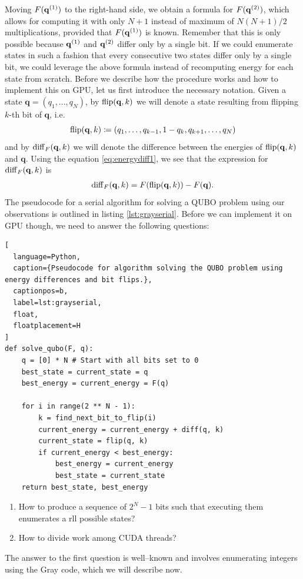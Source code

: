 Moving $F(\mathbf{q}^{(1)})$ to the right-hand side, we obtain a formula for $F(\mathbf{q}^{(2)})$,
which allows for computing it with only $N+1$ instead of maximum of $N(N+1)/2$
multiplications, provided that $F(\mathbf{q}^{(1)})$ is known. Remember that this is only
possible because $\mathbf{q}^{(1)}$ and $\mathbf{q}^{(2)}$ differ only by a single bit. If we could
enumerate states in such a fashion that every consecutive two states differ
only by a single bit, we could leverage the above formula instead of
recomputing energy for each state from scratch. Before we describe how the
procedure works and how to implement this on GPU, let us first introduce the
necessary notation. Given a state $\mathbf{q} = (q_{1},\ldots,q_{N})$, by
$\operatorname*{flip}(\mathbf{q},k)$ we will denote a state resulting from flipping $k$-th
bit of $\mathbf{q}$, i.e.
\begin{equation}
  \operatorname*{flip}(\mathbf{q},k) \coloneq (q_{1}, \ldots, q_{k-1}, 1-q_{k}, q_{k+1}, \ldots, q_{N})
\end{equation}
and by $\operatorname{diff}_{F}(\mathbf{q},k)$ we will denote the difference between the
energies of $\operatorname*{flip}(\mathbf{q},k)$ and $\mathbf{q}$. Using the equation
\eqref{eq:energydiff1}, we see that the expression for
$\operatorname{diff}_{F}(\mathbf{q},k)$ is
\begin{align}
  \begin{split}
    \operatorname{diff}_{F}(\mathbf{q},k) = F(\operatorname*{flip}(\mathbf{q},k)) - F(\mathbf{q}).
  \end{split}
\end{align}
The pseudocode for a serial algorithm for solving a QUBO problem using our
observations is outlined in listing \ref{lst:grayserial}. Before we can
implement it on GPU though, we need to answer the following questions:
\begin{lstlisting}[
  language=Python,
  caption={Pseudocode for algorithm solving the QUBO problem using energy differences and bit flips.},
  captionpos=b,
  label=lst:grayserial,
  float,
  floatplacement=H
]
def solve_qubo(F, q):
    q = [0] * N # Start with all bits set to 0
    best_state = current_state = q
    best_energy = current_energy = F(q)

    for i in range(2 ** N - 1):
        k = find_next_bit_to_flip(i)
        current_energy = current_energy + diff(q, k)
        current_state = flip(q, k)
        if current_energy < best_energy:
            best_energy = current_energy
            best_state = current_state
    return best_state, best_energy
\end{lstlisting}
\begin{enumerate}
  \item How to produce a sequence of $2^{N}-1$ bits such that executing them enumerates
   a rll possible states?
  \item How to divide work among CUDA threads?
\end{enumerate}
The answer to the first question is well--known and involves enumerating
integers using the Gray code, which we will describe now.

